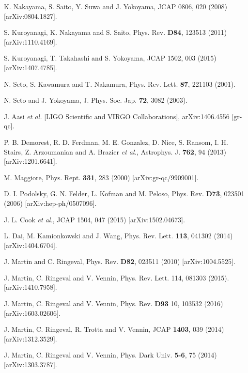 \documentclass[11pt,a4paper,twoside]{book}
\begin{document}
\begin{thebibliography}{2}
	 K. Nakayama, S. Saito, Y. Suwa and J. Yokoyama, JCAP 0806, 020 (2008) [arXiv:0804.1827].
	
	 S. Kuroyanagi, K. Nakayama and S. Saito, Phys. Rev. \textbf{D84}, 123513 (2011) [arXiv:1110.4169].
	
	 S. Kuroyanagi, T. Takahashi and S. Yokoyama, JCAP 1502, 003 (2015) [arXiv:1407.4785]. 
	
	 N. Seto, S. Kawamura and T. Nakamura, Phys. Rev. Lett. \textbf{87}, 221103 (2001).
	
	 N. Seto and J. Yokoyama, J. Phys. Soc. Jap. \textbf{72}, 3082 (2003).
	
	 J. Aasi \textit{et al.} [LIGO Scientific and VIRGO Collaborations], arXiv:1406.4556 [gr-qc].
	
	 P. B. Demorest, R. D. Ferdman, M. E. Gonzalez, D. Nice, S. Ransom, I. H. Stairs, Z. Arzoumanian and A. Brazier \textit{et al.}, Astrophys. J. \textbf{762}, 94 (2013) [arXiv:1201.6641].
		
	 M. Maggiore, Phys. Rept. \textbf{331}, 283 (2000) [arXiv:gr-qc/9909001].	
	
	 D. I. Podolsky, G. N. Felder, L. Kofman and M. Peloso, Phys. Rev. \textbf{D73}, 023501 (2006) [arXiv:hep-ph/0507096].
	
	 J. L. Cook \textit{et al.}, JCAP 1504, 047 (2015) [arXiv:1502.04673].
	
	 L. Dai, M. Kamionkowski and J. Wang, Phys. Rev. Lett. \textbf{113}, 041302 (2014) [arXiv:1404.6704].
	
	 J. Martin and C. Ringeval, Phys. Rev. \textbf{D82}, 023511 (2010) [arXiv:1004.5525].
	
	 J. Martin, C. Ringeval and V. Vennin, Phys. Rev. Lett. 114, 081303 (2015). [arXiv:1410.7958].
	
	 J. Martin, C. Ringeval and V. Vennin, Phys. Rev. \textbf{D93} 10, 103532 (2016) [arXiv:1603.02606].
	
	 J. Martin, C. Ringeval, R. Trotta and V. Vennin, JCAP \textbf{1403}, 039 (2014) [arXiv:1312.3529].
	
	 J. Martin, C. Ringeval and V. Vennin, Phys. Dark Univ. \textbf{5-6}, 75 (2014) [arXiv:1303.3787].
	

\end{thebibliography}
\end{document}
